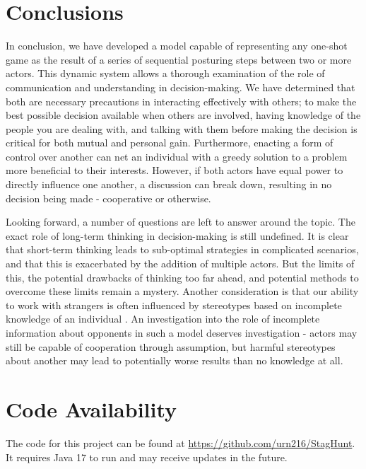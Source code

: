 \chapter{Conclusions}\label{C:con}

In conclusion, we have developed a model capable of representing any one-shot game as the result of a series of sequential posturing steps between two or more actors. This dynamic system allows a thorough examination of the role of communication and understanding in decision-making. We have determined that both are necessary precautions in interacting effectively with others; to make the best possible decision available when others are involved, having knowledge of the people you are dealing with, and talking with them before making the decision is critical for both mutual and personal gain. Furthermore, enacting a form of control over another can net an individual with a greedy solution to a problem more beneficial to their interests. However, if both actors have equal power to directly influence one another, a discussion can break down, resulting in no decision being made - cooperative or otherwise.

Looking forward, a number of questions are left to answer around the topic. The exact role of long-term thinking in decision-making is still undefined. It is clear that short-term thinking leads to sub-optimal strategies in complicated scenarios, and that this is exacerbated by the addition of multiple actors. But the limits of this, the potential drawbacks of thinking too far ahead, and potential methods to overcome these limits remain a mystery. Another consideration is that our ability to work with strangers is often influenced by stereotypes based on incomplete knowledge of an individual \cite{burnett2010bootstrapping}. An investigation into the role of incomplete information about opponents in such a model deserves investigation - actors may still be capable of cooperation through assumption, but harmful stereotypes about another may lead to potentially worse results than no knowledge at all.

\chapter{Code Availability}

The code for this project can be found at \url{https://github.com/urn216/StagHunt}. It requires Java 17 to run and may receive updates in the future.

